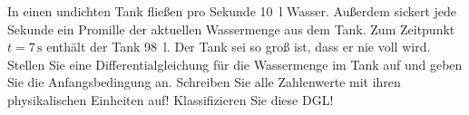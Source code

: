 \item

In einen undichten Tank fließen pro Sekunde 10~l Wasser. Außerdem sickert jede Sekunde ein Promille der aktuellen Wassermenge aus dem Tank. Zum Zeitpunkt $t=7\,\mbox{s}$ enthält der Tank 98~l. Der Tank sei so groß ist, dass er nie voll wird. Stellen Sie eine Differentialgleichung für die Wassermenge im Tank auf und geben Sie die Anfangsbedingung an. Schreiben Sie alle Zahlenwerte mit ihren physikalischen Einheiten auf! Klassifizieren Sie diese DGL!
